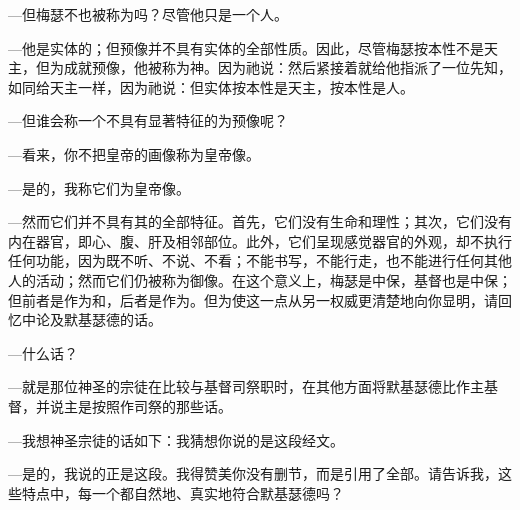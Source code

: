 —但梅瑟不也被称为吗？尽管他只是一个人。\par

—他是实体的；但预像并不具有实体的全部性质。因此，尽管梅瑟按本性不是天主，但为成就预像，他被称为神。因为祂说：然后紧接着就给他指派了一位先知，如同给天主一样，因为祂说：但实体按本性是天主，按本性是人。\par

—但谁会称一个不具有显著特征的为预像呢？\par

—看来，你不把皇帝的画像称为皇帝像。\par

—是的，我称它们为皇帝像。\par

—然而它们并不具有其的全部特征。首先，它们没有生命和理性；其次，它们没有内在器官，即心、腹、肝及相邻部位。此外，它们呈现感觉器官的外观，却不执行任何功能，因为既不听、不说、不看；不能书写，不能行走，也不能进行任何其他人的活动；然而它们仍被称为御像。在这个意义上，梅瑟是中保，基督也是中保；但前者是作为和，后者是作为。但为使这一点从另一权威更清楚地向你显明，请回忆中论及默基瑟德的话。\par

—什么话？\par

—就是那位神圣的宗徒在比较与基督司祭职时，在其他方面将默基瑟德比作主基督，并说主是按照作司祭的那些话。\par

—我想神圣宗徒的话如下：我猜想你说的是这段经文。\par

—是的，我说的正是这段。我得赞美你没有删节，而是引用了全部。请告诉我，这些特点中，每一个都自然地、真实地符合默基瑟德吗？\par

